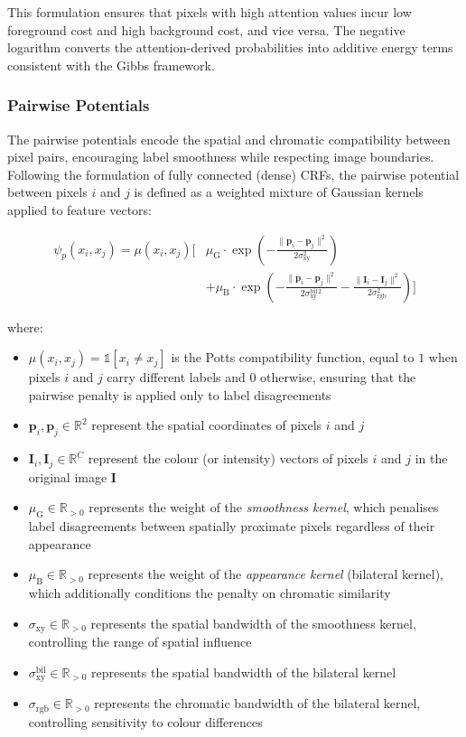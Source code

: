 This formulation ensures that pixels with high attention values incur low foreground cost and high background cost, and vice versa. The negative logarithm converts the attention-derived probabilities into additive energy terms consistent with the Gibbs framework.

\subsubsection{Pairwise Potentials}

The pairwise potentials encode the spatial and chromatic compatibility between pixel pairs, encouraging label smoothness while respecting image boundaries. Following the formulation of fully connected (dense) CRFs, the pairwise potential between pixels $i$ and $j$ is defined as a weighted mixture of Gaussian kernels applied to feature vectors:

\begin{equation}
\label{eq:crf_pairwise}
\begin{aligned}
\psi_p(x_i, x_j) = \mu(x_i, x_j) \biggl[ & \mu_{\text{G}} \cdot \exp\left(-\frac{\|\mathbf{p}_i - \mathbf{p}_j\|^2}{2\sigma_{\text{xy}}^2}\right) \\
& + \mu_{\text{B}} \cdot \exp\left(-\frac{\|\mathbf{p}_i - \mathbf{p}_j\|^2}{2\sigma_{\text{xy}}^{\text{bil}\,2}} - \frac{\|\mathbf{I}_i - \mathbf{I}_j\|^2}{2\sigma_{\text{rgb}}^2}\right) \biggr]
\end{aligned}
\end{equation}

where:
\begin{itemize}
\item $\mu(x_i, x_j) = \mathbb{1}[x_i \neq x_j]$ is the Potts compatibility function, equal to $1$ when pixels $i$ and $j$ carry different labels and $0$ otherwise, ensuring that the pairwise penalty is applied only to label disagreements
\item $\mathbf{p}_i, \mathbf{p}_j \in \mathbb{R}^2$ represent the spatial coordinates of pixels $i$ and $j$
\item $\mathbf{I}_i, \mathbf{I}_j \in \mathbb{R}^C$ represent the colour (or intensity) vectors of pixels $i$ and $j$ in the original image $\mathbf{I}$
\item $\mu_{\text{G}} \in \mathbb{R}_{>0}$ represents the weight of the \textit{smoothness kernel}, which penalises label disagreements between spatially proximate pixels regardless of their appearance
\item $\mu_{\text{B}} \in \mathbb{R}_{>0}$ represents the weight of the \textit{appearance kernel} (bilateral kernel), which additionally conditions the penalty on chromatic similarity
\item $\sigma_{\text{xy}} \in \mathbb{R}_{>0}$ represents the spatial bandwidth of the smoothness kernel, controlling the range of spatial influence
\item $\sigma_{\text{xy}}^{\text{bil}} \in \mathbb{R}_{>0}$ represents the spatial bandwidth of the bilateral kernel
\item $\sigma_{\text{rgb}} \in \mathbb{R}_{>0}$ represents the chromatic bandwidth of the bilateral kernel, controlling sensitivity to colour differences
\end{itemize}

